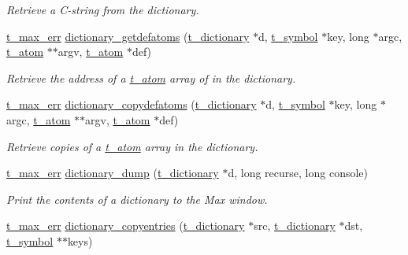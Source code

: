 \begin{DoxyCompactItemize}
\begin{DoxyCompactList}\small\item\em Retrieve a C-\/string from the dictionary. \item\end{DoxyCompactList}\item 
\hyperlink{group__datatypes_ga73edaae82b318855cc09fac994918165}{t\_\-max\_\-err} \hyperlink{group__dictionary_ga2ab733c5d5fe85e31e73d5a66d75dabd}{dictionary\_\-getdefatoms} (\hyperlink{structt__dictionary}{t\_\-dictionary} $\ast$d, \hyperlink{structt__symbol}{t\_\-symbol} $\ast$key, long $\ast$argc, \hyperlink{structt__atom}{t\_\-atom} $\ast$$\ast$argv, \hyperlink{structt__atom}{t\_\-atom} $\ast$def)
\begin{DoxyCompactList}\small\item\em Retrieve the address of a \hyperlink{structt__atom}{t\_\-atom} array of in the dictionary. \item\end{DoxyCompactList}\item 
\hyperlink{group__datatypes_ga73edaae82b318855cc09fac994918165}{t\_\-max\_\-err} \hyperlink{group__dictionary_gaa886af0aad9db9bc6b08314b9b5672f9}{dictionary\_\-copydefatoms} (\hyperlink{structt__dictionary}{t\_\-dictionary} $\ast$d, \hyperlink{structt__symbol}{t\_\-symbol} $\ast$key, long $\ast$argc, \hyperlink{structt__atom}{t\_\-atom} $\ast$$\ast$argv, \hyperlink{structt__atom}{t\_\-atom} $\ast$def)
\begin{DoxyCompactList}\small\item\em Retrieve copies of a \hyperlink{structt__atom}{t\_\-atom} array in the dictionary. \item\end{DoxyCompactList}\item 
\hyperlink{group__datatypes_ga73edaae82b318855cc09fac994918165}{t\_\-max\_\-err} \hyperlink{group__dictionary_ga099020753fc6918512d3bfc2b3fedafc}{dictionary\_\-dump} (\hyperlink{structt__dictionary}{t\_\-dictionary} $\ast$d, long recurse, long console)
\begin{DoxyCompactList}\small\item\em Print the contents of a dictionary to the Max window. \item\end{DoxyCompactList}\item 
\hyperlink{group__datatypes_ga73edaae82b318855cc09fac994918165}{t\_\-max\_\-err} \hyperlink{group__dictionary_ga53ef6b088fed8ef360292a659a383487}{dictionary\_\-copyentries} (\hyperlink{structt__dictionary}{t\_\-dictionary} $\ast$src, \hyperlink{structt__dictionary}{t\_\-dictionary} $\ast$dst, \hyperlink{structt__symbol}{t\_\-symbol} $\ast$$\ast$keys)
$$
\end{DoxyCompactItemize}
